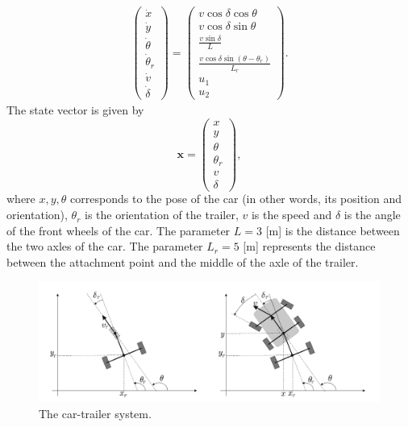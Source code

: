 \documentclass{article}
\begin{document}
\begin{eqnarray*}
\begin{pmatrix}
\dot{x}    \\       
\dot{y}      \\     
\dot{\theta} \\   
\dot{\theta}_r\\ 
\dot{v}           \\
\dot{\delta}   
\end{pmatrix}
=
\begin{pmatrix}
v \cos \delta \cos \theta \\
v \cos \delta \sin \theta\\
\frac{v \sin \delta}{L}\\
\frac{v \cos \delta \sin (\theta -\theta_r)}{L_r}\\
u_1\\
u_2
\end{pmatrix}.
\end{eqnarray*}
The state vector is given by
\begin{equation*}
\mathbf{x} 
=
\begin{pmatrix}
x\\
y\\
\theta\\
\theta_r\\
v\\
\delta
\end{pmatrix},
\end{equation*}
where $x, y, \theta$ corresponds to the pose of the car (in other words, its position and orientation), $\theta_r$ is the orientation of the trailer, $v$ is the speed and $\delta$ is the angle of the front wheels of the car. The
parameter $L = 3$ [m] is the distance between the two axles of the car.
The parameter $L_r = 5$ [m] represents the distance between the
attachment point and the middle of the axle of the trailer.

\begin{figure}[H]
\centerline{\includegraphics[width=0.99\columnwidth]{figures/car-trailer}}
\caption{The car-trailer system.}
\label{fig:figure}
\end{figure}
\end{document}
